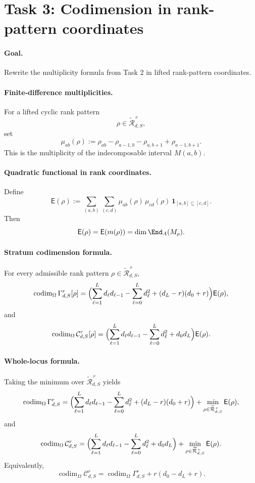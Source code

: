 \section*{Task 3: Codimension in rank-pattern coordinates}

\paragraph{Goal.}
Rewrite the multiplicity formula from Task 2 in lifted rank-pattern
coordinates.

\paragraph{Finite-difference multiplicities.}
For a lifted cyclic rank pattern
\[
\rho\in \widetilde{\mathcal R}_{d,S}^{\,r},
\]
set
\[
\mu_{ab}(\rho):=
\rho_{ab}-\rho_{a-1,b}-\rho_{a,b+1}+\rho_{a-1,b+1}.
\]
This is the multiplicity of the indecomposable interval \(M(a,b)\).

\paragraph{Quadratic functional in rank coordinates.}
Define
\[
\mathsf E(\rho)
:=
\sum_{(a,b)}\sum_{(c,d)}
\mu_{ab}(\rho)\,\mu_{cd}(\rho)\,
\mathbf 1_{[a,b]\subseteq [c,d]}.
\]
Then
\[
\mathsf E(\rho)=\mathsf E(m(\rho))=\dim \End_A(M_\rho).
\]

\paragraph{Stratum codimension formula.}
For every admissible rank pattern \(\rho\in \widetilde{\mathcal R}_{d,S}^{\,r}\),
\[
\operatorname{codim}_{\Omega}\Gamma_{d,S}^r[\rho]
=
\Bigl(
\sum_{\ell=1}^L d_\ell d_{\ell-1}
-\sum_{\ell=0}^L d_\ell^2
+(d_L-r)(d_0+r)
\Bigr)
\mathsf E(\rho),
\]
and
\[
\operatorname{codim}_{\Omega}\mathcal C_{d,S}^r[\rho]
=
\Bigl(
\sum_{\ell=1}^L d_\ell d_{\ell-1}
-\sum_{\ell=0}^L d_\ell^2
+d_0d_L
\Bigr)
\mathsf E(\rho).
\]

\paragraph{Whole-locus formula.}
Taking the minimum over
\(\widetilde{\mathcal R}_{d,S}^{\,r}\) yields
\[
\operatorname{codim}_{\Omega}\Gamma_{d,S}^r
=
\Bigl(
\sum_{\ell=1}^L d_\ell d_{\ell-1}
-\sum_{\ell=0}^L d_\ell^2
+(d_L-r)(d_0+r)
\Bigr)
+
\min_{\rho\in \widetilde{\mathcal R}_{d,S}^{\,r}} \mathsf E(\rho),
\]
and
\[
\operatorname{codim}_{\Omega}\mathcal C_{d,S}^r
=
\Bigl(
\sum_{\ell=1}^L d_\ell d_{\ell-1}
-\sum_{\ell=0}^L d_\ell^2
+d_0d_L
\Bigr)
+
\min_{\rho\in \widetilde{\mathcal R}_{d,S}^{\,r}} \mathsf E(\rho).
\]
Equivalently,
\[
\operatorname{codim}_{\Omega}\mathcal C_{d,S}^r
=
\operatorname{codim}_{\Omega}\Gamma_{d,S}^r
+
r(d_0-d_L+r).
\]

